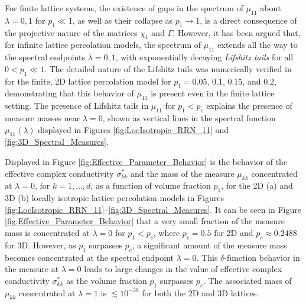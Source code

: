 \documentclass{cmslatex}
\begin{document}
For finite lattice systems, the existence of gaps in the spectrum of
$\mu_{11}$ about $\lambda=0,1$ for $p_1\ll1$, as well as their
collapse as $p_1\to1$, is a direct consequence \cite{Murphy:JMP:063506} of the
projective nature of the matrices $\chi_1$ and $\Gamma$. However, it has been argued
that, for infinite lattice percolation models, the spectrum of $\mu_{11}$
extends all the way to the spectral endpoints $\lambda=0,1$, with
exponentially decaying \emph{Lifshitz tails} for all $0<p_1\ll1$. The
detailed nature of the Lifshitz tails was numerically verified in
\cite{Jonckheere_Luck_JPA_1998} for the finite, 2D lattice percolation
model for $p_1=$0.05, 0.1, 0.15, and 0.2, demonstrating that this
behavior of $\mu_{11}$ is present even in the finite lattice
setting. The presence of Lifshitz tails in $\mu_{11}$ for $p_1<p_c$
explains the presence of measure masses near $\lambda=0$, shown as vertical
lines in the spectral function $\mu_{11}(\lambda)$ displayed in Figures
\ref{fig:LocIsotropic_RRN_11} and \ref{fig:3D_Spectral_Measures}.   

 





Displayed in Figure \ref{fig:Effective_Parameter_Behavior} is the
behavior of the effective complex conductivity $\sigma^*_{kk}$ and the
mass of the measure $\mu_{kk}$ concentrated at $\lambda=0$, for $k=1,\ldots,d$, as
a function of volume fraction $p_1$, for the 2D (a) and 3D (b) locally
isotropic lattice percolation models in Figures
\ref{fig:LocIsotropic_RRN_11}--\ref{fig:3D_Spectral_Measures}. 
It can be seen in Figure \ref{fig:Effective_Parameter_Behavior} that a
very small fraction of the 
measure mass is concentrated at $\lambda=0$ for $p_1<p_c$, where $p_c=0.5$
for 2D and $p_c\approx0.2488$ for 3D. However, as $p_1$ surpasses $p_c$, a
significant amount of the measure mass becomes concentrated at the
spectral endpoint $\lambda=0$. This $\delta$-function behavior in the measure at
$\lambda=0$ leads to large changes in the value of effective complex
conductivity $\sigma^*_{kk}$ as the volume fraction $p_1$ surpasses
$p_c$. The associated mass of $\mu_{kk}$ concentrated at $\lambda=1$ is
$\lesssim10^{-30}$ for both the 2D and 3D lattices.  
\end{document}
